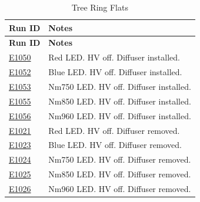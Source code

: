 \begin{longtable}{|p{5.0cm}|p{8.5cm}|}
\caption{Tree Ring Flats}\label{table:runs_treeRing} \\
\hline
\textbf{Run ID} & \textbf{Notes} \\ \hline
\endfirsthead
\hline
\textbf{Run ID} & \textbf{Notes} \\ \hline
\endhead
\hline
\endfoot
\hline
\endlastfoot

\href{https://s3df.slac.stanford.edu/data/rubin/lsstcam/E1050/w_2024_35/}{E1050} & Red LED. HV off. Diffuser installed. \\ \hline
\href{https://s3df.slac.stanford.edu/data/rubin/lsstcam/E1052/w_2024_35/}{E1052} & Blue LED. HV off. Diffuser installed. \\ \hline
\href{https://s3df.slac.stanford.edu/data/rubin/lsstcam/E1053/w_2024_35/}{E1053} & Nm750 LED. HV off. Diffuser installed. \\ \hline
\href{https://s3df.slac.stanford.edu/data/rubin/lsstcam/E1055/w_2024_35/}{E1055} & Nm850 LED. HV off. Diffuser installed. \\ \hline
\href{https://s3df.slac.stanford.edu/data/rubin/lsstcam/E1056/w_2024_35/}{E1056} & Nm960 LED. HV off. Diffuser installed. \\ \hline
\href{https://s3df.slac.stanford.edu/data/rubin/lsstcam/E1021/w_2024_35/}{E1021} & Red LED. HV off. Diffuser removed. \\ \hline
\href{https://s3df.slac.stanford.edu/data/rubin/lsstcam/E1023/w_2024_35/}{E1023} & Blue LED. HV off. Diffuser removed. \\ \hline
\href{https://s3df.slac.stanford.edu/data/rubin/lsstcam/E1024/w_2024_35/}{E1024} & Nm750 LED. HV off. Diffuser removed. \\ \hline
\href{https://s3df.slac.stanford.edu/data/rubin/lsstcam/E1025/w_2024_35/}{E1025} & Nm850 LED. HV off. Diffuser removed. \\ \hline
\href{https://s3df.slac.stanford.edu/data/rubin/lsstcam/E1026/w_2024_35/}{E1026} & Nm960 LED. HV off. Diffuser removed. \\ \hline

\end{longtable}

